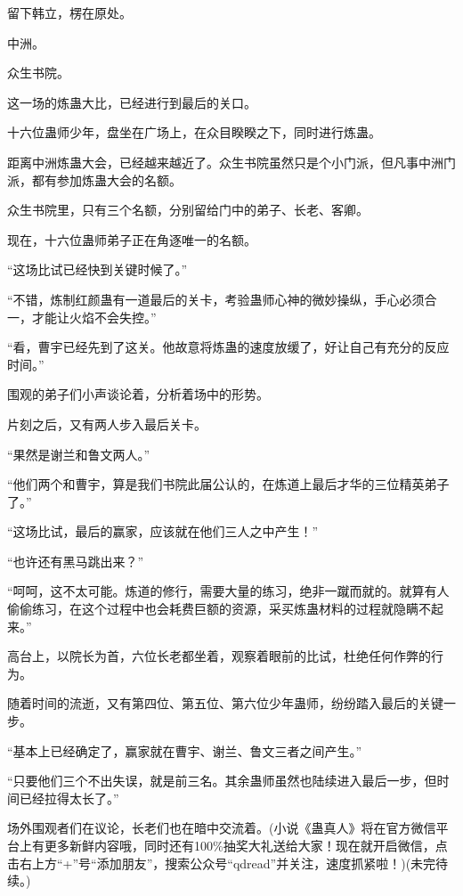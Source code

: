 \begin{this_body}
留下韩立，楞在原处。

中洲。

众生书院。

这一场的炼蛊大比，已经进行到最后的关口。

十六位蛊师少年，盘坐在广场上，在众目睽睽之下，同时进行炼蛊。

距离中洲炼蛊大会，已经越来越近了。众生书院虽然只是个小门派，但凡事中洲门派，都有参加炼蛊大会的名额。

众生书院里，只有三个名额，分别留给门中的弟子、长老、客卿。

现在，十六位蛊师弟子正在角逐唯一的名额。

“这场比试已经快到关键时候了。”

“不错，炼制红颜蛊有一道最后的关卡，考验蛊师心神的微妙操纵，手心必须合一，才能让火焰不会失控。”

“看，曹宇已经先到了这关。他故意将炼蛊的速度放缓了，好让自己有充分的反应时间。”

围观的弟子们小声谈论着，分析着场中的形势。

片刻之后，又有两人步入最后关卡。

“果然是谢兰和鲁文两人。”

“他们两个和曹宇，算是我们书院此届公认的，在炼道上最后才华的三位精英弟子了。”

“这场比试，最后的赢家，应该就在他们三人之中产生！”

“也许还有黑马跳出来？”

“呵呵，这不太可能。炼道的修行，需要大量的练习，绝非一蹴而就的。就算有人偷偷练习，在这个过程中也会耗费巨额的资源，采买炼蛊材料的过程就隐瞒不起来。”

高台上，以院长为首，六位长老都坐着，观察着眼前的比试，杜绝任何作弊的行为。

随着时间的流逝，又有第四位、第五位、第六位少年蛊师，纷纷踏入最后的关键一步。

“基本上已经确定了，赢家就在曹宇、谢兰、鲁文三者之间产生。”

“只要他们三个不出失误，就是前三名。其余蛊师虽然也陆续进入最后一步，但时间已经拉得太长了。”

场外围观者们在议论，长老们也在暗中交流着。(小说《蛊真人》将在官方微信平台上有更多新鲜内容哦，同时还有100\%抽奖大礼送给大家！现在就开启微信，点击右上方“+”号“添加朋友”，搜索公众号“qdread”并关注，速度抓紧啦！)(未完待续。)

\end{this_body}

